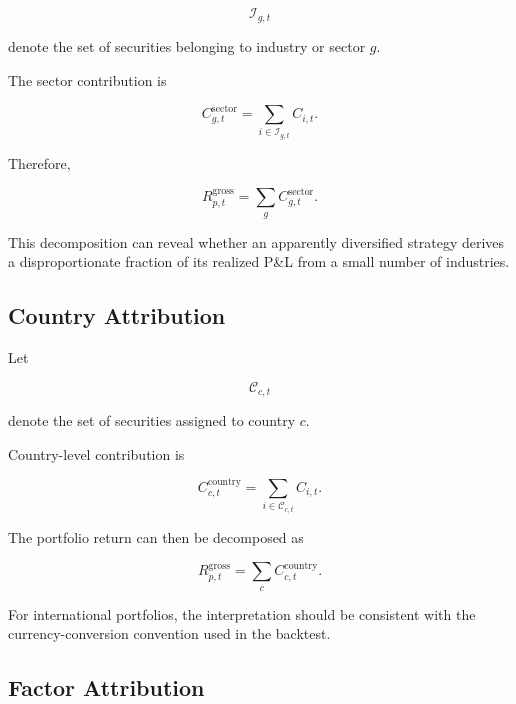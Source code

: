 \documentclass[11pt,a4paper]{article}
\begin{document}
\begin{equation}
\mathcal{I}_{g,t}
\end{equation}

denote the set of securities belonging to industry or sector $g$.

The sector contribution is

\begin{equation}
\boxed{
C_{g,t}^{\mathrm{sector}}
=
\sum_{i\in\mathcal{I}_{g,t}}
C_{i,t}.
}
\end{equation}

Therefore,

\begin{equation}
\boxed{
R_{p,t}^{\mathrm{gross}}
=
\sum_g
C_{g,t}^{\mathrm{sector}}.
}
\end{equation}

This decomposition can reveal whether an apparently diversified strategy
derives a disproportionate fraction of its realized P\&L from a small number of
industries.


\subsection{Country Attribution}

Let

\begin{equation}
\mathcal{C}_{c,t}
\end{equation}

denote the set of securities assigned to country $c$.

Country-level contribution is

\begin{equation}
\boxed{
C_{c,t}^{\mathrm{country}}
=
\sum_{i\in\mathcal{C}_{c,t}}
C_{i,t}.
}
\end{equation}

The portfolio return can then be decomposed as

\begin{equation}
R_{p,t}^{\mathrm{gross}}
=
\sum_c
C_{c,t}^{\mathrm{country}}.
\end{equation}

For international portfolios, the interpretation should be consistent with the
currency-conversion convention used in the backtest.


\subsection{Factor Attribution}
\end{document}
